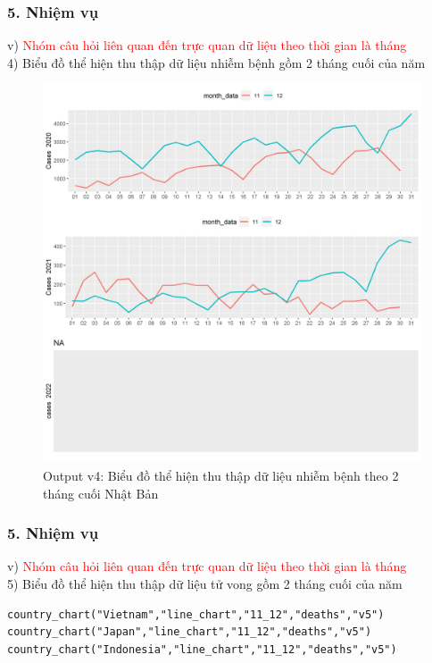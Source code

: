 \documentclass[english,10pt,table]{beamer}
\begin{document}
\begin{frame}[fragile]
\frametitle{5.  Nhiệm vụ}
v) \textcolor{red}{Nhóm câu hỏi liên quan đến trực quan dữ liệu theo thời gian là tháng}\\
    4) Biểu đồ thể hiện thu thập dữ liệu nhiễm bệnh gồm 2 tháng cuối của năm
	\begin{figure}[h!]
	\begin{center}
		    \includegraphics[scale = 0.25]{Images/V/v4 Japan .jpeg}
		     \caption{Output v4: Biểu đồ thể hiện thu thập dữ liệu nhiễm bệnh theo 2 tháng cuối Nhật Bản}
		\end{center}
		\end{figure}
\end{frame}

\begin{frame}[fragile]
\frametitle{5.  Nhiệm vụ}
v) \textcolor{red}{Nhóm câu hỏi liên quan đến trực quan dữ liệu theo thời gian là tháng}\\
    5) Biểu đồ thể hiện thu thập dữ liệu tử vong gồm 2 tháng cuối của năm
    \begin{lstlisting}[frame=single,basicstyle=\tiny]  
country_chart("Vietnam","line_chart","11_12","deaths","v5")
country_chart("Japan","line_chart","11_12","deaths","v5")
country_chart("Indonesia","line_chart","11_12","deaths","v5")
		\end{lstlisting}
\end{frame}
\end{document}
